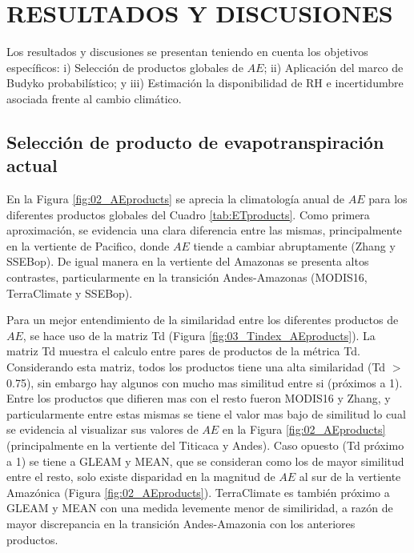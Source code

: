 \documentclass[12pt]{article}
\begin{document}
\clearpage
\vspace*{0.5mm}
\section{RESULTADOS Y DISCUSIONES}

Los resultados y discusiones se presentan teniendo en cuenta los objetivos específicos: i) Selección de productos globales de $AE$; ii) Aplicación del marco de Budyko probabilístico; y iii) Estimación la disponibilidad de RH e incertidumbre asociada frente al cambio climático.

\subsection{Selección de producto de evapotranspiración actual}

En la Figura \ref{fig:02_AEproducts} se aprecia la climatología anual de $AE$ para los diferentes productos globales del Cuadro \ref{tab:ETproducts}. Como primera aproximación, se evidencia una clara diferencia entre las mismas, principalmente en la vertiente de Pacifico, donde $AE$ tiende a cambiar abruptamente (Zhang y SSEBop). De igual manera en la vertiente del Amazonas se presenta altos contrastes, particularmente en la transición Andes-Amazonas (MODIS16, TerraClimate y SSEBop). 



Para un mejor entendimiento de la similaridad entre los diferentes productos de $AE$, se hace uso de la matriz Td (Figura \ref{fig:03_Tindex_AEproducts}). La matriz Td muestra el calculo entre pares de productos de la métrica Td. Considerando esta matriz, todos los productos tiene una alta similaridad (Td $>$ 0.75), sin embargo hay algunos con mucho mas similitud entre si (próximos a 1). Entre los productos que difieren mas con el resto fueron MODIS16 y Zhang, y particularmente entre estas mismas se tiene el valor mas bajo de similitud lo cual se evidencia al visualizar sus valores de $AE$ en la Figura \ref{fig:02_AEproducts} (principalmente en la vertiente del Titicaca y Andes). Caso opuesto (Td próximo a 1) se tiene a GLEAM y MEAN, que se consideran como los de mayor similitud entre el resto, solo existe disparidad en la magnitud de $AE$ al sur de la vertiente Amazónica (Figura \ref{fig:02_AEproducts}). TerraClimate es también próximo a GLEAM y MEAN con una medida levemente menor de similiridad, a razón de mayor discrepancia en la transición Andes-Amazonia con los anteriores productos.
\end{document}
